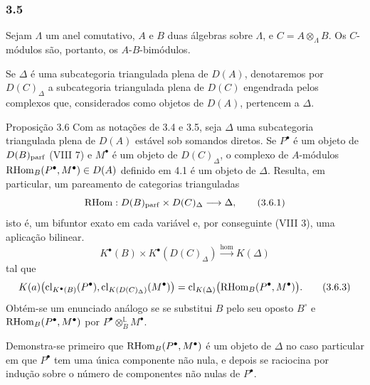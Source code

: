 \subsubsection*{3.5}

Sejam $\Lambda$ um anel comutativo, $A$ e $B$ duas álgebras sobre $\Lambda$, e $C=A\otimes_{\Lambda}B$. Os $C$-módulos são, portanto, os $A$-$B$-bimódulos.

Se $\Delta$ é uma subcategoria triangulada plena de $D(A)$, denotaremos por $D(C)_{\Delta}$ a subcategoria triangulada plena de $D(C)$ engendrada pelos complexos que, considerados como objetos de $D(A)$, pertencem a $\Delta$.

\begin{statement}{Proposição 3.6}
Com as notações de 3.4 e 3.5, seja $\Delta$ uma subcategoria triangulada plena de $D(A)$ estável sob somandos diretos. Se $P^\bullet$ é um objeto de $D(B)_{\mathrm{parf}}$ (VIII 7) e $M^\bullet$ é um objeto de $D(C)_{\Delta}$, o complexo de $A$-módulos $\mathrm{RHom}_B(P^\bullet,M^\bullet)\in D(A)$ definido em 4.1 é um objeto de $\Delta$. Resulta, em particular, um pareamento de categorias trianguladas
\[
\mathrm{RHom}:D(B)_{\mathrm{parf}}\times D(C)_{\Delta}\longrightarrow \Delta,
\tag{3.6.1}
\]
isto é, um bifuntor exato em cada variável e, por conseguinte (VIII 3), uma aplicação bilinear.
\[
K^{\bullet}(B)\times K^{\bullet}(D(C)_{\Delta})\xrightarrow{\operatorname{hom}} K(\Delta)
\tag{3.6.2}
\]
tal que
\[
K(a)\bigl(\operatorname{cl}_{K^{\bullet}(B)}(P^\bullet),\operatorname{cl}_{K(D(C)_{\Delta})}(M^\bullet)\bigr)
=\operatorname{cl}_{K(\Delta)}\bigl(\mathrm{RHom}_B(P^\bullet,M^\bullet)\bigr).
\tag{3.6.3}
\]
Obtém-se um enunciado análogo se se substitui $B$ pelo seu oposto $B^\circ$ e $\mathrm{RHom}_B(P^\bullet,M^\bullet)$ por $P^\bullet\otimes_B^{\mathbb L}M^\bullet$.
\end{statement}

\begin{prooftext}[Demonstração]
Demonstra-se primeiro que $\mathrm{RHom}_B(P^\bullet,M^\bullet)$ é um objeto de $\Delta$ no caso particular em que $P^\bullet$ tem uma única componente não nula, e depois se raciocina por indução sobre o número de componentes não nulas de $P^\bullet$.
\end{prooftext}
